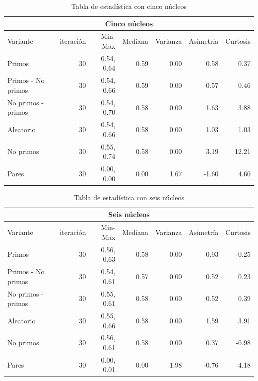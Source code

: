 \documentclass{article}
\begin{document}
\begin{table}[H]
\begin{center}
\begin{tabular}{|l | r | r | r | r | r | r|}
\hline
\multicolumn{7}{|c|}{Cinco núcleos}\\
\hline
Variante&iteración&Min-Max&Mediana&Varianza&Asimetría&Curtosis\\
\hline
 Primos               & 30 & 0.54, 0.64  & 0.59 & 0.00 & 0.58   & 0.37\\
 Primos - No primos   & 30 & 0.54, 0.66  & 0.59 & 0.00 & 0.57   & 0.46\\
 No primos - primos   & 30 & 0.54, 0.70  & 0.58 & 0.00  & 1.63  & 3.88\\
 Aleatorio            & 30 & 0.54, 0.66  & 0.58 & 0.00 & 1.03   & 1.03\\
 No primos            & 30 & 0.55, 0.74  & 0.58 & 0.00 & 3.19   & 12.21\\
 Pares                & 30 & 0.00, 0.00  & 0.00 & 1.67 & -1.60  & 4.60\\
\hline
\end{tabular}
\caption{Tabla de estadística con cinco núcleos}
\label{table:1}
\end{center}
\end{table}

\begin{table}[H]
\begin{center}
\begin{tabular}{|l | r | r | r | r | r | r|}
\hline
\multicolumn{7}{|c|}{Seis núcleos}\\
\hline
Variante&iteración&Min-Max&Mediana&Varianza&Asimetría&Curtosis\\
\hline
 Primos               & 30 & 0.56, 0.63  & 0.58 & 0.00 & 0.93   & -0.25\\
 Primos - No primos   & 30 & 0.54, 0.61  & 0.57 & 0.00 & 0.52   & 0.23\\
 No primos - primos   & 30 & 0.55, 0.61  & 0.58 & 0.00  &0.52  &  0.39\\
 Aleatorio            & 30 & 0.55, 0.66  & 0.58 & 0.00 & 1.59   & 3.91\\
 No primos            & 30 & 0.56, 0.61  & 0.58 & 0.00 & 0.37   & -0.98\\
 Pares                & 30 & 0.00, 0.01  & 0.00 & 1.98 & -0.76  & 4.18\\
\hline
\end{tabular}
\caption{Tabla de estadística con seis núcleos}
\label{table:1}
\end{center}
\end{table}
\end{document}
